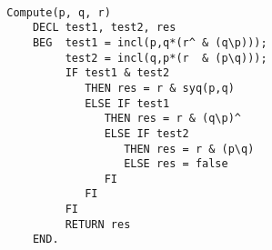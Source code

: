 \begin{program}
\label{prog:compute}~
	\begin{lstlisting}
		Compute(p, q, r)
		    DECL test1, test2, res
		    BEG  test1 = incl(p,q*(r^ & (q\p)));
		         test2 = incl(q,p*(r  & (p\q)));
		         IF test1 & test2
		            THEN res = r & syq(p,q)
		            ELSE IF test1
		               THEN res = r & (q\p)^
		               ELSE IF test2
		                  THEN res = r & (p\q)
		                  ELSE res = false 
		               FI 
		            FI 
		         FI       
		         RETURN res
		    END.
	\end{lstlisting}
\end{program}